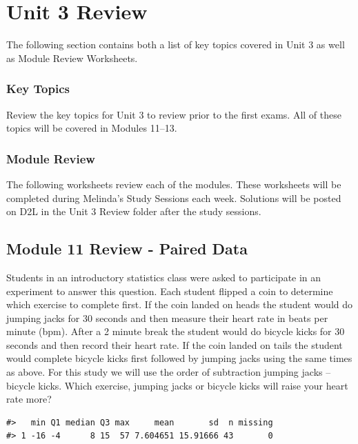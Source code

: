 \documentclass[
]{report}
\begin{document}
\newpage

\chapter{Unit 3 Review}\label{unit-3-review}

The following section contains both a list of key topics covered in Unit 3 as well as Module Review Worksheets.

\subsection{Key Topics}\label{key-topics-10}

Review the key topics for Unit 3 to review prior to the first exams. All of these topics will be covered in Modules 11--13.

\subsection{Module Review}\label{module-review-2}


The following worksheets review each of the modules. These worksheets will be completed during Melinda's Study Sessions each week. Solutions will be posted on D2L in the Unit 3 Review folder after the study sessions.

\newpage

\section{Module 11 Review - Paired Data}\label{module-11-review---paired-data}

Students in an introductory statistics class were asked to participate in an experiment to answer this question. Each student flipped a coin to determine which exercise to complete first. If the coin landed on heads the student would do jumping jacks for 30 seconds and then measure their heart rate in beats per minute (bpm). After a 2 minute break the student would do bicycle kicks for 30 seconds and then record their heart rate. If the coin landed on tails the student would complete bicycle kicks first followed by jumping jacks using the same times as above. For this study we will use the order of subtraction jumping jacks -- bicycle kicks. Which exercise, jumping jacks or bicycle kicks will raise your heart rate more?

\begin{verbatim}
#>   min Q1 median Q3 max     mean       sd  n missing
#> 1 -16 -4      8 15  57 7.604651 15.91666 43       0
\end{verbatim}
\end{document}
